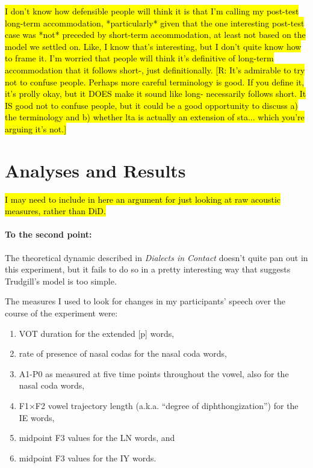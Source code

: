     \hl{I don't know how defensible people will think it is that I'm calling my post-test long-term accommodation, *particularly* given that the one interesting post-test case was *not* preceded by short-term accommodation, at least not based on the model we settled on. Like, I know that's interesting, but I don't quite know how to frame it. I'm worried that people will think it's definitive of long-term accommodation that it follows short-, just definitionally. [R: It's admirable to try not to confuse people. Perhaps more careful terminology is good. If you define it, it's prolly okay, but it DOES make it sound like long- necessarily follows short. It IS good not to confuse people, but it could be a good opportunity to discuss a) the terminology and b) whether lta is actually an extension of sta... which you're arguing it's not.]}

\section{Analyses and Results}
\label{sec:shadowingResults}
\hl{I may need to include in here an argument for just looking at raw acoustic measures, rather than DiD.}

\paragraph{To the second point:}
    The theoretical dynamic described in \textit{Dialects in Contact} \citep{trudgill1986dialects} doesn't quite pan out in this experiment, but it fails to do so in a pretty interesting way that suggests Trudgill's model is too simple.

    The measures I used to look for changes in my participants' speech over the course of the experiment were:
    \begin{enumerate}
        \item VOT duration for the extended [p] words,
        \item rate of presence of nasal codas for the nasal coda words,
        \item A1-P0 as measured at five time points throughout the vowel, also for the nasal coda words,
        \item F1$\times$F2 vowel trajectory length (a.k.a. ``degree of diphthongization'') for the IE words,
        \item midpoint F3 values for the LN words, and
        \item midpoint F3 values for the IY words.
    \end{enumerate}
    

